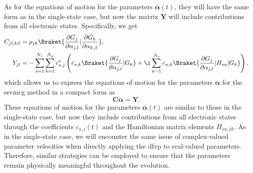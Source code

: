 As for the equations of motion for the parameters $\symbf{\alpha}(t)$, they will have the same form as in the single-state case, but now the matrix $\symbf{Y}$ will include contributions from all electronic states. Specifically, we get
\begin{align}
C_{jl,k\beta}&=\rho_{jk}\Braket{\frac{\partial G_j}{\partial \alpha_{j,l}}|\frac{\vphantom{G_j}\partial G_k}{\partial\alpha_{k,\beta}}},\\
Y_{jl}&=-\sum_{\vphantom{k}s=1}^{\vphantom{N_g}N_s}\sum_{k=1}^{N_g}c_{s,j}^\ast\left(\dot c_{s,k}\Braket{\frac{\partial G_j}{\partial\alpha_{j,l}}|G_k}+\i\sum_{u=1}^{N_s}c_{u,k}\Braket{\frac{\partial G_j}{\partial\alpha_{j,l}}|H_{su}|G_k}\right),
\end{align}
which allows us to express the equations of motion for the parameters $\symbf{\alpha}$ for the \acrshort{ssvmcg} method in a compact form as
\begin{equation}\label{eq:ssvmcg_eom_lambda}
\symbf{C}\dot{\symbf{\alpha}}=\symbf{Y}.
\end{equation}
These equations of motion for the parameters $\symbf{\alpha}(t)$ are similar to those in the single-state case, but now they include contributions from all electronic states through the coefficients $c_{s,j}(t)$ and the Hamiltonian matrix elements $H_{su,jk}$. As in the single-state case, we will encounter the same issue of complex-valued parameter velocities when directly applying the \acrshort{dfvp} to real-valued parameters. Therefore, similar strategies can be employed to ensure that the parameters remain physically meaningful throughout the evolution.
